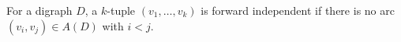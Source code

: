 \begin{definition}
For a digraph \(D\), a \(k\)-tuple \((v_1,\ldots,v_k)\) is forward independent if there is no arc \((v_i,v_j)\in A(D)\) with \(i<j\).
\end{definition}

